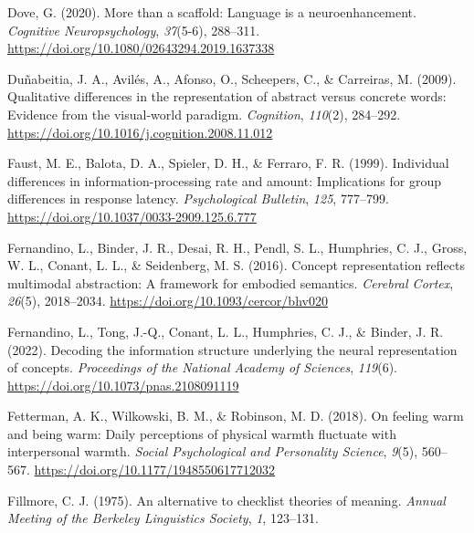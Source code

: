 \documentclass[
  12pt,
  man,floatsintext]{apa7}
\newlength{\cslhangindent}
\newlength{\cslentryspacingunit} %
\newenvironment{CSLReferences}[2] %
 {%
  \setlength{\parindent}{0pt}
  \ifodd #1
  \let\oldpar\par
  \def\par{\hangindent=\cslhangindent\oldpar}
  \fi
  \setlength{\parskip}{#2\cslentryspacingunit}
 }%
 {}
\begin{document}
\begin{CSLReferences}{1}{0}
\leavevmode{}%
Dove, G. (2020). More than a scaffold: {Language} is a neuroenhancement. \emph{Cognitive Neuropsychology}, \emph{37}(5-6), 288--311. \url{https://doi.org/10.1080/02643294.2019.1637338}

\leavevmode{}%
Duñabeitia, J. A., Avilés, A., Afonso, O., Scheepers, C., \& Carreiras, M. (2009). Qualitative differences in the representation of abstract versus concrete words: {Evidence} from the visual-world paradigm. \emph{Cognition}, \emph{110}(2), 284--292. \url{https://doi.org/10.1016/j.cognition.2008.11.012}

\leavevmode{}%
Faust, M. E., Balota, D. A., Spieler, D. H., \& Ferraro, F. R. (1999). Individual differences in information-processing rate and amount: {Implications} for group differences in response latency. \emph{Psychological Bulletin}, \emph{125}, 777--799. \url{https://doi.org/10.1037/0033-2909.125.6.777}

\leavevmode{}%
Fernandino, L., Binder, J. R., Desai, R. H., Pendl, S. L., Humphries, C. J., Gross, W. L., Conant, L. L., \& Seidenberg, M. S. (2016). Concept representation reflects multimodal abstraction: {A} framework for embodied semantics. \emph{Cerebral Cortex}, \emph{26}(5), 2018--2034. \url{https://doi.org/10.1093/cercor/bhv020}

\leavevmode{}%
Fernandino, L., Tong, J.-Q., Conant, L. L., Humphries, C. J., \& Binder, J. R. (2022). Decoding the information structure underlying the neural representation of concepts. \emph{Proceedings of the National Academy of Sciences}, \emph{119}(6). \url{https://doi.org/10.1073/pnas.2108091119}

\leavevmode{}%
Fetterman, A. K., Wilkowski, B. M., \& Robinson, M. D. (2018). On feeling warm and being warm: {Daily} perceptions of physical warmth fluctuate with interpersonal warmth. \emph{Social Psychological and Personality Science}, \emph{9}(5), 560--567. \url{https://doi.org/10.1177/1948550617712032}

\leavevmode{}%
Fillmore, C. J. (1975). An alternative to checklist theories of meaning. \emph{Annual {Meeting} of the {Berkeley Linguistics Society}}, \emph{1}, 123--131.


\end{CSLReferences}
\end{document}
